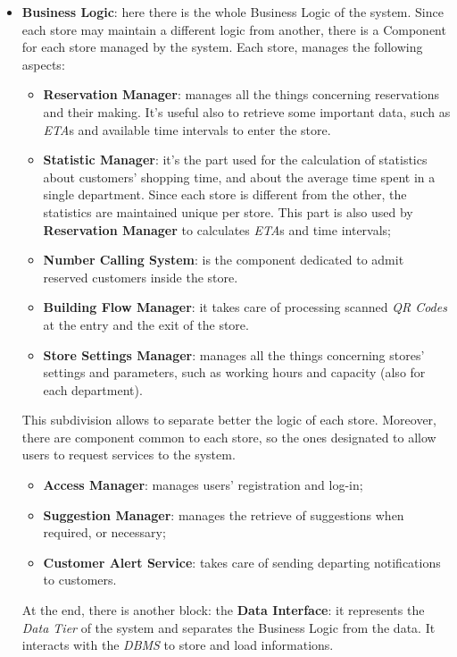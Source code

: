 \documentclass{article}
\begin{document}
\begin{itemize}
		\item{\bfseries Business Logic}: here there is the whole Business Logic of the system. Since each store may maintain a different logic from another, there is a Component for each store managed by the system. Each store, manages the following aspects:
		\begin{itemize}
			\item{\bfseries Reservation Manager}: manages all the things concerning reservations and their making. It's useful also to retrieve some important data, such as \emph{ETA}s and available time intervals to enter the store.
			\item{\bfseries Statistic Manager}: it's the part used for the calculation of statistics about customers' shopping time, and about the average time spent in a single department. Since each store is different from the other, the statistics are maintained unique per store. This part is also used by \textbf{Reservation Manager} to calculates \emph{ETA}s and time intervals;
			\item{\bfseries Number Calling System}: is the component dedicated to admit reserved customers inside the store.
			\item{\bfseries Building Flow Manager}: it takes care of processing scanned \emph{QR Codes} at the entry and the exit of the store.
			\item{\bfseries Store Settings Manager}: manages all the things concerning stores' settings and parameters, such as working hours and capacity (also for each department).
			
		\end{itemize} This subdivision allows to separate better the logic of each store. Moreover, there are component common to each store, so the ones designated to allow users to request services to the system.
		\begin{itemize}
			\item {\bfseries Access Manager}: manages users' registration and log-in;
			\item {\bfseries Suggestion Manager}: manages the retrieve of suggestions when required, or necessary;
			\item{\bfseries Customer Alert Service}: takes care of sending departing notifications to customers.
		\end{itemize}
	At the end, there is another block: the \textbf{Data Interface}: it represents the \emph{Data Tier} of the system and separates the Business Logic from the data. It interacts with the \emph{DBMS} to store and load informations.
	\end{itemize}
\end{document}

